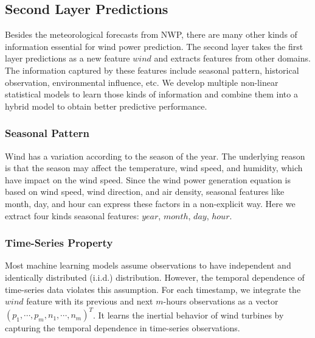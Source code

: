 \documentclass[conference]{IEEEtran}
\begin{document}
\subsection{Second Layer Predictions}
Besides the meteorological forecasts from NWP, there are many other kinds of information essential for wind power prediction. The second layer takes the first layer predictions as a new feature $wind$ and extracts features from other domains. The information captured by these features include seasonal pattern, historical observation, environmental influence, etc. We develop multiple non-linear statistical models to learn those kinds of information and combine them into a hybrid model to obtain better predictive performance.

\subsubsection{Seasonal Pattern}
Wind has a variation according to the season of the year. The underlying reason is that the season may affect the temperature, wind speed, and humidity, which have impact on the wind speed. Since the wind power generation equation is based on wind speed, wind direction, and air density, seasonal features like month, day, and hour can express these factors in a non-explicit way. Here we extract four kinds seasonal features: $year$, $month$, $day$, $hour$. %

\subsubsection{Time-Series Property}
Most machine learning models assume observations to have independent and identically distributed (i.i.d.) distribution. However, the temporal dependence of time-series data violates this assumption. For each timestamp, we integrate the $wind$ feature with its previous and next $m$-hours observations as a vector $(p_1,\cdots,p_m, n_1,\cdots,n_m)^T$. It learns the inertial behavior of wind turbines by capturing the temporal dependence in time-series observations.

\end{document}
